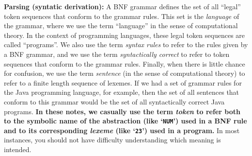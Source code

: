 \begin{minipage}[t]{\sw}
\slidenumber
\LARGE
{\bf Parsing (syntatic derivation):}\exx
\emm{\Large\LightBox{\MYlon}}\exx
A BNF grammar defines
the set of all ``legal'' token sequences
that conform to the grammar rules.
This set is the {\em language} of the grammar,
where we use the term ``language'' in the sense
of computational theory.
In the context of programming languages,
these legal token sequences are called ``programs''.
We also use the term {\em syntax rules} to refer
to the rules given by a BNF grammar,
and we use the term {\em syntactically correct} to refer
to token sequences that conform to the grammar rules.
Finally, when there is little chance for confusion,
we use the term {\em sentence} (in the sense of computational theory)
to refer to a finite length sequence of lexemes.\exx
If we had a set of grammar rules
for the Java programming language, for example,
then the set of all sentences that conform to this grammar
would be the set of all syntactically correct Java programs.\exx
{\bf In these notes,
we casually use the term {\em token}
to refer both to the symbolic name
of the abstraction (like `\verb'NUM'') used in a BNF rule
and to its corresponding {\em lexeme} (like `\verb'23'')
used in a program.}
In most instances, you should not have difficulty
understanding which meaning is intended.
\end{minipage}
\clearpage

